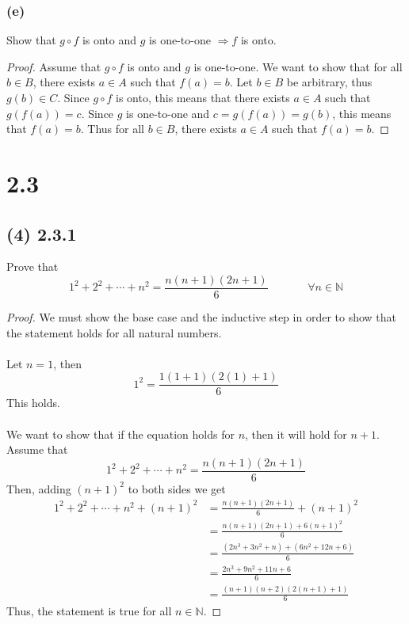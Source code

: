 \documentclass{article}
\begin{document}
\subsubsection*{(e)}
Show that $g \circ f$ is onto and $g$ is one-to-one $\Longrightarrow f$ is onto.
\begin{proof}
    Assume that $g \circ f$ is onto and $g$ is one-to-one.
    We want to show that for all $b \in B$, there exists $a \in A$ such that $f(a) = b$.
    Let $b \in B$ be arbitrary, thus $g(b) \in C$.
    Since $g \circ f$ is onto, this means that there exists $a \in A$ such that $g(f(a)) = c$.
    Since $g$ is one-to-one and $c = g(f(a)) = g(b)$, this means that $f(a) = b$.
    Thus for all $b \in B$, there exists $a \in A$ such that $f(a) = b$.
\end{proof}
\section*{2.3}
\subsection*{(4) 2.3.1}
Prove that
\[ 1^2 + 2^2 + \cdots + n^2 = \frac{n(n+1)(2n+1)}{6}  \ \ \ \ \ \ \ \  
\ \ \ \ \ \ \ \ \forall n \in \mathbb{N}\]
\begin{proof}
    We must show the base case and the inductive step in order to show that the statement holds for all natural numbers.
    \\\\
    Let $n = 1$, then
    \[ 1^2 = \frac{1(1+1)(2(1)+1)}{6} \]
    This holds.
    \\\\
    We want to show that if the equation holds for $n$, then it will hold for $n + 1$.
    Assume that \[ 1^2 + 2^2 + \cdots + n^2 = \dfrac{n(n+1)(2n+1)}{6} \]
    Then, adding $(n+1)^2$ to both sides we get
    \begin{align*}
        1^2 + 2^2 + \cdots + n^2 + (n+1)^2 & = \frac{n(n+1)(2n+1)}{6} + (n+1) ^2 \\
        & = \frac{n(n+1)(2n+1) + 6(n+1)^2}{6} \\
        & = \frac{(2n^3 + 3n^2 + n) + (6n^2 + 12n + 6)}{6} \\
        & = \frac{2n^3 + 9n^2 +11n + 6}{6} \\
        & = \frac{(n+1)(n+2)(2(n+1)+1)}{6}
    \end{align*}
    Thus, the statement is true for all $n \in \mathbb{N}$.
\end{proof}
\end{document}

